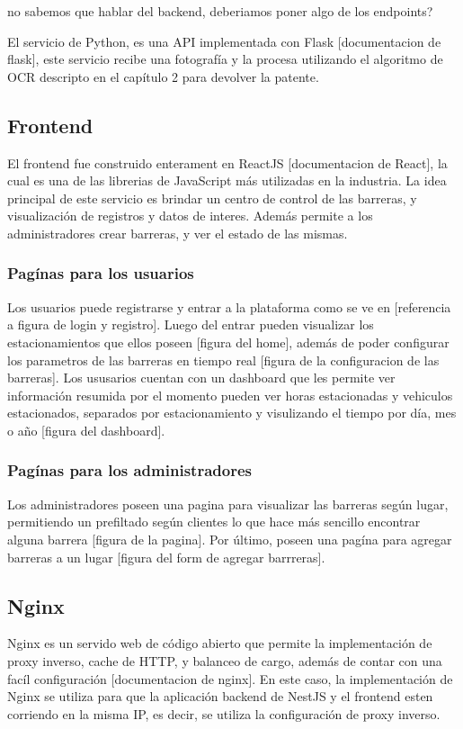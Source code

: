 {\huge no sabemos que hablar del backend, deberiamos poner algo de los endpoints?}

El servicio de Python, es una API implementada con Flask [documentacion de flask], este servicio recibe una fotografía y la procesa utilizando el algoritmo de OCR descripto en el capítulo 2 para devolver la patente.


\subsection{Frontend}

El frontend fue construido enterament en ReactJS [documentacion de React], la cual es una de las librerias de JavaScript más utilizadas en la industria. La idea principal de este servicio es brindar un centro de control de las barreras, y visualización de registros y datos de interes. Además permite a los administradores crear barreras, y ver el estado de las mismas.

\subsubsection*{Pagínas para los usuarios}

Los usuarios puede registrarse y entrar a la plataforma como se ve en [referencia a figura de login y registro]. Luego del entrar pueden visualizar los estacionamientos que ellos poseen [figura del home], además de poder configurar los parametros de las barreras en tiempo real [figura de la configuracion de las barreras]. Los ususarios cuentan con un dashboard que les permite ver información resumida por el momento pueden ver horas estacionadas y vehiculos estacionados, separados por estacionamiento y visulizando el tiempo por día, mes o año [figura del dashboard].

\subsubsection*{Pagínas para los administradores}

Los administradores poseen una pagina para visualizar las barreras según lugar, permitiendo un prefiltado según clientes lo que hace más sencillo encontrar alguna barrera [figura de la pagina]. Por último, poseen una pagína para agregar barreras a un lugar [figura del form de agregar barrreras].

\subsection{Nginx}

Nginx es un servido web de código abierto que permite la implementación de proxy inverso, cache de HTTP, y balanceo de cargo, además de contar con una facíl configuración [documentacion de nginx].
En este caso, la implementación de Nginx se utiliza para que la aplicación backend de NestJS y el frontend esten corriendo en la misma IP, es decir, se utiliza la configuración de proxy inverso.